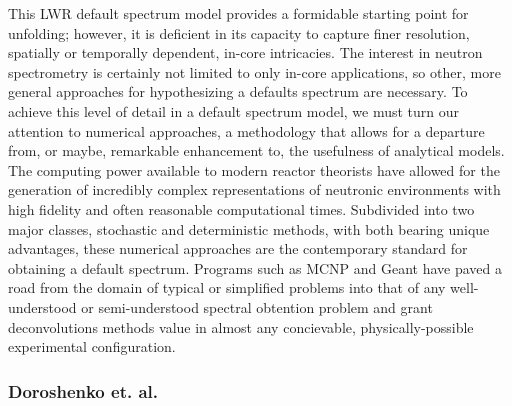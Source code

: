 This LWR default spectrum model provides a formidable starting point for unfolding; however, it is deficient in its capacity to capture finer resolution, spatially or temporally dependent, in-core intricacies.
The interest in neutron spectrometry is certainly not limited to only in-core applications, so other, more general approaches for hypothesizing a defaults spectrum are necessary.
To achieve this level of detail in a default spectrum model, we must turn our attention to numerical approaches, a methodology that allows for a departure from, or maybe, remarkable enhancement to, the usefulness of analytical models.
The computing power available to modern reactor theorists have allowed for the generation of incredibly complex representations of neutronic environments with high fidelity and often reasonable computational times.
Subdivided into two major classes, stochastic and deterministic methods, with both bearing unique advantages, these numerical approaches are the contemporary standard for obtaining a default spectrum.
Programs such as MCNP and Geant have paved a road from the domain of typical or simplified problems into that of any well-understood or semi-understood spectral obtention problem and grant deconvolutions methods value in almost any concievable, physically-possible experimental configuration.



\subsubsection{Doroshenko et. al.}


